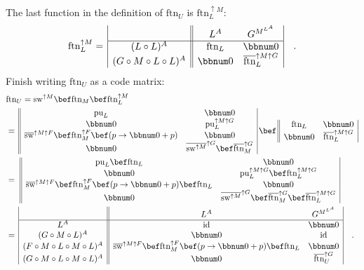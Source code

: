 The last function in the definition of $\text{ftn}_{U}$ is $\text{ftn}_{L}^{\uparrow M}$:
\[
\text{ftn}_{L}^{\uparrow M}=\,\begin{array}{|c||cc|}
 & L^{A} & G^{M^{L^{A}}}\\
\hline (L\circ L)^{A} & \text{ftn}_{L} & \bbnum 0\\
(G\circ M\circ L\circ L)^{A} & \bbnum 0 & \overline{\text{ftn}}_{L}^{\uparrow M\uparrow G}
\end{array}\quad.
\]
Finish writing $\text{ftn}_{U}$ as a code matrix:
\begin{align*}
 & \text{ftn}_{U}=\text{sw}^{\uparrow M}\bef\text{ftn}_{M}\bef\text{ftn}_{L}^{\uparrow M}\\
 & =\,\begin{array}{||cc|}
\text{pu}_{L} & \bbnum 0\\
\bbnum 0 & \text{pu}_{L}^{\uparrow M\uparrow G}\\
\overline{\text{sw}}^{\uparrow M\uparrow F}\bef\text{ftn}_{M}^{\uparrow F}\bef(p\rightarrow\bbnum 0+p) & \bbnum 0\\
\bbnum 0 & \overline{\text{sw}^{\uparrow M}}^{\uparrow G}\bef\overline{\text{ftn}}_{M}^{\uparrow G}
\end{array}\,\bef\,\begin{array}{||cc|}
\text{ftn}_{L} & \bbnum 0\\
\bbnum 0 & \overline{\text{ftn}}_{L}^{\uparrow M\uparrow G}
\end{array}\\
 & =\,\,\begin{array}{||cc|}
\text{pu}_{L}\bef\text{ftn}_{L} & \bbnum 0\\
\bbnum 0 & \text{pu}_{L}^{\uparrow M\uparrow G}\bef\text{ftn}_{L}^{\uparrow M\uparrow G}\\
\overline{\text{sw}}^{\uparrow M\uparrow F}\bef\text{ftn}_{M}^{\uparrow F}\bef(p\rightarrow\bbnum 0+p)\bef\text{ftn}_{L} & \bbnum 0\\
\bbnum 0 & \overline{\text{sw}^{\uparrow M}}^{\uparrow G}\bef\overline{\text{ftn}}_{M}^{\uparrow G}\bef\overline{\text{ftn}}_{L}^{\uparrow M\uparrow G}
\end{array}\\
 & =\,\begin{array}{|c||cc|}
 & L^{A} & G^{M^{L^{A}}}\\
\hline L^{A} & \text{id} & \bbnum 0\\
(G\circ M\circ L)^{A} & \bbnum 0 & \text{id}\\
(F\circ M\circ L\circ M\circ L)^{A} & \overline{\text{sw}}^{\uparrow M\uparrow F}\bef\text{ftn}_{M}^{\uparrow F}\bef(p\rightarrow\bbnum 0+p)\bef\text{ftn}_{L} & \bbnum 0\\
(G\circ M\circ L\circ M\circ L)^{A} & \bbnum 0 & \overline{\text{ftn}}_{U}^{\uparrow G}
\end{array}\quad.
\end{align*}

